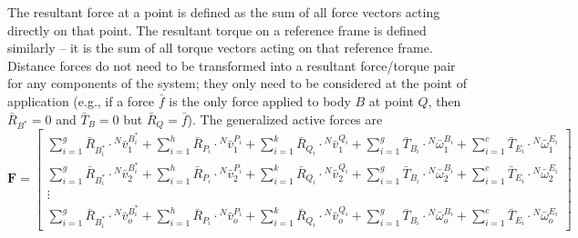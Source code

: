 \documentclass[smallcondensed,final]{svjour3}                     %
\begin{document}
The resultant force at a point is defined as the sum of all force vectors
acting directly on that point. The resultant torque on a reference frame is
defined similarly -- it is the sum of all torque vectors acting on that
reference frame. Distance forces do not need to be transformed into a resultant
force/torque pair for any components of the system; they only need to be
considered at the point of application (e.g., if a force $\bar{f}$ is the only
force applied to body $B$ at point $Q$, then $\bar{R}_{B^*}=0$ and
$\bar{T}_B=0$ but $\bar{R}_Q=\bar{f}$). The generalized active forces are
\begin{equation}
\label{eq:definition_F}
\mathbf{F} =
\begin{bmatrix}
\displaystyle \sum_{i=1}^g \bar{R}_{B^*_i} \cdot {^N}\bar{v}^{B^*_i}_1 +
\sum_{i=1}^h \bar{R}_{P_i} \cdot {^N}\bar{v}^{P_i}_1 +
\sum_{i=1}^k \bar{R}_{Q_i} \cdot {^N}\bar{v}^{Q_i}_1 +
\sum_{i=1}^g \bar{T}_{B_i} \cdot {^N}\bar{\omega}^{B_i}_1 +
\sum_{i=1}^c \bar{T}_{E_i} \cdot {^N}\bar{\omega}^{E_i}_1 \\
\displaystyle \sum_{i=1}^g \bar{R}_{B^*_i} \cdot {^N}\bar{v}^{B^*_i}_2 +
\sum_{i=1}^h \bar{R}_{P_i} \cdot {^N}\bar{v}^{P_i}_2 +
\sum_{i=1}^k \bar{R}_{Q_i} \cdot {^N}\bar{v}^{Q_i}_2 +
\sum_{i=1}^g \bar{T}_{B_i} \cdot {^N}\bar{\omega}^{B_i}_2 +
\sum_{i=1}^c \bar{T}_{E_i} \cdot {^N}\bar{\omega}^{E_i}_2 \\
\displaystyle \vdots \\
\displaystyle \sum_{i=1}^g \bar{R}_{B^*_i} \cdot {^N}\bar{v}^{B^*_i}_o +
\sum_{i=1}^h \bar{R}_{P_i} \cdot {^N}\bar{v}^{P_i}_o +
\sum_{i=1}^k \bar{R}_{Q_i} \cdot {^N}\bar{v}^{Q_i}_o +
\sum_{i=1}^g \bar{T}_{B_i} \cdot {^N}\bar{\omega}^{B_i}_o +
\sum_{i=1}^c \bar{T}_{E_i} \cdot {^N}\bar{\omega}^{E_i}_o
\end{bmatrix}
\end{equation}
\end{document}
